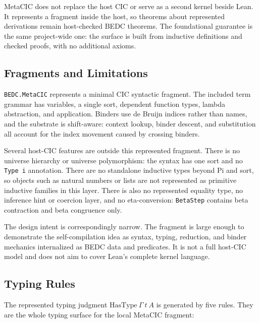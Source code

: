 MetaCIC does not replace the host CIC or serve as a second kernel beside Lean.
It represents a fragment inside the host, so theorems about represented
derivations remain host-checked BEDC theorems. The foundational guarantee is
the same project-wide one: the surface is built from inductive definitions and
checked proofs, with no additional axioms.



\subsection{Fragments and Limitations}\label{subsec:reconstruction-fragments-limitations}

\texttt{BEDC.MetaCIC} represents a minimal CIC syntactic fragment. The included
term grammar has variables, a single sort, dependent function types, lambda
abstraction, and application. Binders use de Bruijn indices rather than names,
and the substrate is shift-aware: context lookup, binder descent, and
substitution all account for the index movement caused by crossing binders.

Several host-CIC features are outside this represented fragment. There is no
universe hierarchy or universe polymorphism: the syntax has one sort and no
\texttt{Type i} annotation. There are no standalone inductive types beyond
Pi and sort, so objects such as natural numbers or lists are not represented
as primitive inductive families in this layer. There is also no represented
equality type, no inference hint or coercion layer, and no eta-conversion:
\texttt{BetaStep} contains beta contraction and beta congruence only.

The design intent is correspondingly narrow. The fragment is large enough to
demonstrate the self-compilation idea as syntax, typing, reduction, and binder
mechanics internalized as BEDC data and predicates. It is not a full host-CIC
model and does not aim to cover Lean's complete kernel language.

\subsection{Typing Rules}\label{subsec:reconstruction-typing-rules}

The represented typing judgment $\mathrm{HasType}\ \Gamma\ t\ A$ is generated
by five rules. They are the whole typing surface for the local MetaCIC
fragment:

